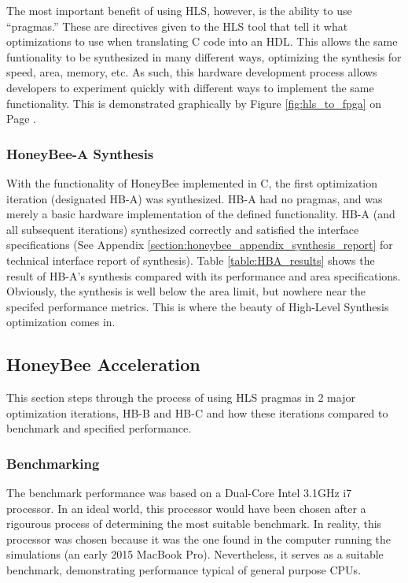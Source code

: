         The most important benefit of using \gls{HLS}, however, is the ability to use ``pragmas.'' These are directives given to the \gls{HLS} tool that tell it what optimizations to use when translating C code into an \gls{HDL}. This allows the same funtionality to be synthesized in many different ways, optimizing the synthesis for speed, area, memory, etc. As such, this hardware development process allows developers to experiment quickly with different ways to implement the same functionality. This is demonstrated graphically by Figure \ref{fig:hls_to_fpga} on Page \pageref{fig:hls_to_fpga}.

        

    \subsubsection{HoneyBee-A Synthesis}
        With the functionality of HoneyBee implemented in C, the first optimization iteration (designated \gls{HB-A}) was synthesized. \gls{HB-A} had no pragmas, and was merely a basic hardware implementation of the defined functionality. \gls{HB-A} (and all subsequent iterations) synthesized correctly and satisfied the interface specifications (See Appendix \ref{section:honeybee_appendix_synthesis_report} for technical interface report of synthesis). Table \ref{table:HBA_results} shows the result of \gls{HB-A}'s synthesis compared with its performance and area specifications. Obviously, the synthesis is well below the area limit, but nowhere near the specifed performance metrics. This is where the beauty of High-Level Synthesis optimization comes in.

        

\newpage
\subsection{HoneyBee Acceleration}
    This section steps through the process of using \gls{HLS} \glspl{pragma} in 2 major optimization iterations, \gls{HB-B} and \gls{HB-C} and how these iterations compared to benchmark and specified performance.

    \subsubsection{Benchmarking}
        The benchmark performance was based on a Dual-Core Intel 3.1GHz i7 processor. In an ideal world, this processor would have been chosen after a rigourous process of determining the most suitable benchmark. In reality, this processor was chosen because it was the one found in the computer running the simulations (an early 2015 MacBook Pro). Nevertheless, it serves as a suitable benchmark, demonstrating performance typical of general purpose CPUs.

